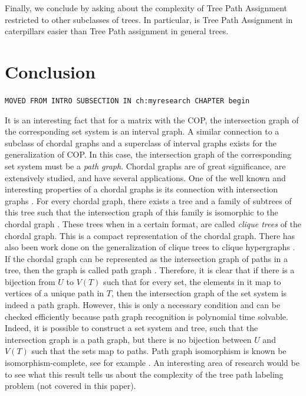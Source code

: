 \documentclass[MS]             %
              {iitmdiss_as}    %
\begin{document}
\noindent
Finally, we conclude by asking about the complexity of Tree Path
Assignment restricted to other subclasses of trees.  In particular, is
Tree Path Assignment in caterpillars easier than Tree Path assignment
in general trees.



\chapter{Conclusion}
\label{ch:conclusion}

\begin{center}
{\tt MOVED FROM INTRO SUBSECTION IN ch:myresearch CHAPTER begin}
\end{center}

  It is an interesting fact that for a matrix with the COP, the
  intersection graph of the corresponding set system is an interval
  graph. %
A
similar connection to a subclass of chordal graphs and a superclass of
interval graphs exists for the generalization of COP.  In this case,
the intersection graph of the corresponding set system must be a {\em
  path graph}. Chordal graphs are of great significance, are
extensively studied, and have several applications.  One of the well
known and interesting properties of a chordal graphs is its connection
with intersection graphs \cite{mcg04}. For every chordal graph, there
exists a tree and a family of subtrees of this tree such that the
intersection graph of this family is isomorphic to the chordal graph
\cite{plr70,gav78,bp93}.  These trees when in a certain format, are
called {\em clique trees} \cite{apy92} of the chordal graph. This is a
compact representation of the chordal graph. There has also been work
done on the generalization of clique trees to clique hypergraphs
\cite{km02}.  If the chordal graph can be represented as the
intersection graph of paths in a tree, then the graph is called path
graph \cite{mcg04}.  Therefore, it is clear that if there is a
bijection from $U$ to $V(T)$ such that for every set, the elements in
it map to vertices of a unique path in $T$, then the intersection
graph of the set system is indeed a path graph.  However, this is only
a necessary condition and can be checked efficiently because path
graph recognition is polynomial time
solvable\cite{gav78,aas93}. Indeed, it is possible to construct a set
system and tree, such that the intersection graph is a path graph, but
there is no bijection between $U$ and $V(T)$ such that the sets map to
paths. Path graph isomorphism is known be isomorphism-complete, see
for example \cite{kklv10}. An interesting area of research would be to
see what this result tells us about the complexity of the tree path
labeling problem (not covered in this paper).
\end{document}
